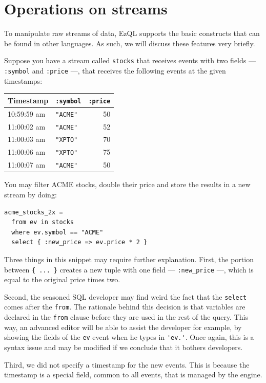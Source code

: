 \documentclass{report}
\begin{document}
\section{Operations on streams}
\label{sec:stream-operations}

To manipulate raw streams of data, EzQL supports the basic constructs
that can be found in other languages. As such, we will discuss these
features very briefly.

Suppose you have a stream called \verb=stocks= that receives events
with two fields --- \verb=:symbol= and \verb=:price= ---, that
receives the following events at the given timestamps:

\begin{tabular}{ |l|l|r| }
  \hline
  Timestamp & \verb=:symbol= & \verb=:price= \\
  \hline
  10:59:59 am & \verb="ACME"= & 50 \\
  11:00:02 am & \verb="ACME"= & 52 \\
  11:00:03 am & \verb="XPTO"= & 70 \\
  11:00:06 am & \verb="XPTO"= & 75 \\
  11:00:07 am & \verb="ACME"= & 50 \\
  \hline
\end{tabular}

You may filter ACME stocks, double their price and store the results
in a new stream by doing:

\begin{verbatim}
acme_stocks_2x =
  from ev in stocks
  where ev.symbol == "ACME"
  select { :new_price => ev.price * 2 }
\end{verbatim}

Three things in this snippet may require further explanation. First,
the portion between \verb={ ... }= creates a new tuple with one field
--- \verb=:new_price= ---, which is equal to the original price times
two.

Second, the seasoned SQL developer may find weird the fact that the
\verb=select= comes after the \verb=from=. The rationale behind this
decision is that variables are declared in the \verb=from= clause
before they are used in the rest of the query. This way, an advanced
editor will be able to assist the developer for example, by showing
the fields of the \verb=ev= event when he types in \verb='ev.'=. Once
again, this is a syntax issue and may be modified if we conclude that
it bothers developers.

Third, we did not specify a timestamp for the new events. This is
because the timestamp is a special field, common to all events, that
is managed by the engine.
\end{document}
